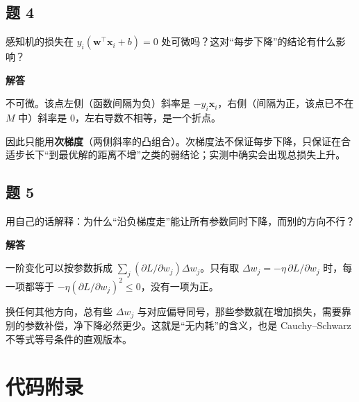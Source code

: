 \documentclass[UTF8, a4paper, zihao=-4, fontset=none]{ctexart}
\begin{document}
\subsection*{题 4}



感知机的损失在 $y_i(\mathbf{w}^\top\mathbf{x}_i+b)=0$ 处可微吗？这对“每步下降”的结论有什么影响？



\begin{answerbox}
{\bfseries\sffamily\small\color{accent} 解答}\par\vspace{2pt}
不可微。该点左侧（函数间隔为负）斜率是 $-y_i\mathbf{x}_i$，右侧（间隔为正，该点已不在 $M$ 中）斜率是 $0$，左右导数不相等，是一个折点。


因此只能用\textbf{次梯度}（两侧斜率的凸组合）。次梯度法不保证每步下降，只保证在合适步长下“到最优解的距离不增”之类的弱结论；实测中确实会出现总损失上升。


\end{answerbox}




\subsection*{题 5}



用自己的话解释：为什么“沿负梯度走”能让所有参数同时下降，而别的方向不行？



\begin{answerbox}
{\bfseries\sffamily\small\color{accent} 解答}\par\vspace{2pt}
一阶变化可以按参数拆成 $\sum_j(\partial L/\partial w_j)\Delta w_j$。只有取 $\Delta w_j=-\eta\,\partial L/\partial w_j$ 时，每一项都等于 $-\eta(\partial L/\partial w_j)^2\le0$，没有一项为正。


换任何其他方向，总有些 $\Delta w_j$ 与对应偏导同号，那些参数就在增加损失，需要靠别的参数补偿，净下降必然更少。这就是“无内耗”的含义，也是 Cauchy–Schwarz 不等式等号条件的直观版本。


\end{answerbox}




\clearpage

\section{代码附录}
\end{document}

